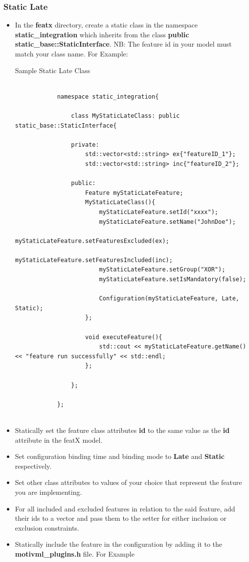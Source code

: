 \documentclass{article}
\newenvironment{longlisting}{\captionsetup{type=listing}}{}
\begin{document}
\subsubsection{Static Late}
\begin{itemize}
	\item In the \textbf{featx} directory, create a static class in the namespace \textbf{static\_integration} which inherits from the class \textbf{public static\_base::StaticInterface}. NB: The feature id in your model must match your class name. For Example:
	
	\begin{longlisting}
		\caption{Sample Static Late Class}
		\begin{verbatim}
			
			namespace static_integration{
				
				class MyStaticLateClass: public static_base::StaticInterface{
					
				private:
					std::vector<std::string> ex{"featureID_1"};
					std::vector<std::string> inc{"featureID_2"};
					
				public:
					Feature myStaticLateFeature;
					MyStaticLateClass(){
						myStaticLateFeature.setId("xxxx");
						myStaticLateFeature.setName("JohnDoe");
						myStaticLateFeature.setFeaturesExcluded(ex);
						myStaticLateFeature.setFeaturesIncluded(inc);
						myStaticLateFeature.setGroup("XOR");
						myStaticLateFeature.setIsMandatory(false);
						
						Configuration(myStaticLateFeature, Late, Static);
					};
					
					void executeFeature(){
						std::cout << myStaticLateFeature.getName() << "feature run successfully" << std::endl;
					};
					
				};
				
			};
			
		\end{verbatim}
		\label{samplestaticlate}
	\end{longlisting}
	\item Statically set the feature class attributes \textbf{id} to the same value as the \textbf{id} attribute in the featX model.
	\item Set configuration binding time and binding mode to \textbf{Late} and \textbf{Static} respectively.
	\item Set other class attributes to values of your choice that represent the feature you are implementing.
	\item For all included and excluded features in relation to the said feature, add their ids to a vector and pass them to the setter for either inclusion or exclusion constraints.
	\item Statically include the feature in the configuration by adding it to the \textbf{motivml\_plugins.h} file. For Example
	

\end{itemize}
\end{document}
